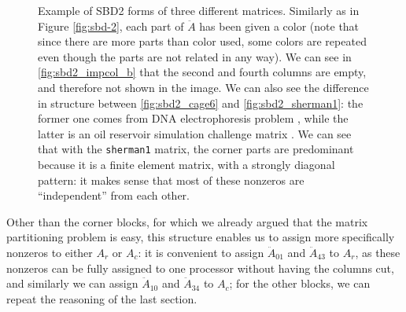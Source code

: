 \begin{figure}[h]
	\caption{Example of SBD2 forms of three different matrices. Similarly as in Figure \ref{fig:sbd-2}, each part of $\ddot{A}$ has been given a color (note that since there are more parts than color used, some colors are repeated even though the parts are not related in any way).	We can see in \ref{fig:sbd2_impcol_b} that the second and fourth columns are empty, and therefore not shown in the image. We can also see the difference in structure between \ref{fig:sbd2_cage6} and \ref{fig:sbd2_sherman1}: the former one comes from DNA electrophoresis problem \cite{ufl}, while the latter is an oil reservoir simulation challenge matrix \cite{matrixmarket}. We can see that with the \texttt{sherman1} matrix, the corner parts are predominant because it is a finite element matrix, with a strongly diagonal pattern: it makes sense that most of these nonzeros are ``independent'' from each other. }  \label{fig:sbd2-2}
\end{figure}

Other than the corner blocks, for which we already argued that the matrix partitioning problem is easy, this structure enables us to assign more specifically nonzeros to either $A_r$ or $A_c$: it is convenient to assign $\ddot{A}_{01}$ and $\ddot{A}_{43}$ to $A_r$, as these nonzeros can be fully assigned to one processor without having the columns cut, and similarly we can assign $\ddot{A}_{10}$ and $\ddot{A}_{34}$ to $A_c$; for the other blocks, we can repeat the reasoning of the last section.

